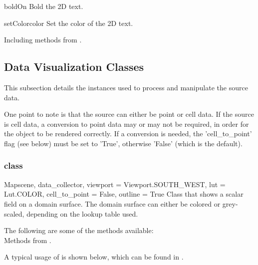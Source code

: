 \begin{methoddesc}[Text2D]{boldOn}{}
Bold the 2D text.
\end{methoddesc}

\begin{methoddesc}[Text2D]{setColor}{color}
Set the color of the 2D text.
\end{methoddesc}

Including methods from \ActorTwoD. 




\subsection{Data Visualization Classes}
This subsection details the instances used to process and manipulate the source
data.

One point to note is that the source can either be point or cell data. If the
source is cell data, a conversion to point data may or may not be
required, in order for the object to be rendered correctly.
If a conversion is needed, the 'cell_to_point' flag (see below) must be set to
'True', otherwise 'False' (which is the default).

\subsubsection{\Map class}

\begin{classdesc}{Map}{scene, data_collector, 
viewport = Viewport.SOUTH_WEST, lut = Lut.COLOR, cell_to_point = False,
outline = True}
Class that shows a scalar field on a domain surface. The domain surface 
can either be colored or grey-scaled, depending on the lookup table used.
\end{classdesc}

The following are some of the methods available:\\
Methods from \ActorThreeD.

A typical usage of \Map is shown below, which can be found in 
\texttt{\PyvisiExampleDirectory}.

